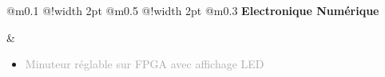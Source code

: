 \documentclass{article}
\begin{document}
\begin{tabular}
    {
        @{}m{}
        @{\hspace{0.001\textwidth}}!{\color{secondaryBlue}\vline width 2pt} %
        @{}m{0.5\textwidth}
        @{\hspace{0.025\textwidth}}!{\color{secondaryBlue}\vline width 2pt} %
        @{{\hspace{0.001\textwidth}}}m{0.3\textwidth}
    }
    \textcolor{secondaryBlue}
    {
        \textbf{Electronique Numérique}
    } 

    &
    \begin{itemize}
        [label={}, topsep=8pt, partopsep=0pt, itemsep=0.5pt, parsep=2pt,after=\vspace*{-\baselineskip}]
        \setlength{\itemsep}{10pt}
        \item \textcolor{darkGray}{Minuteur réglable sur FPGA avec affichage LED}
        \begin{itemize}
        [label={\textcolor{gray!80}{\checkmark}}, topsep=8pt, partopsep=0pt, itemsep=0.5pt, parsep=2pt, after=\vspace*{-\baselineskip}] 


\end{itemize}
\end{itemize}
\end{tabular}
\end{document}
